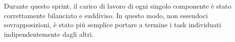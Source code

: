 Durante questo sprint, il carico di lavoro di ogni singolo componente è stato correttamente bilanciato e suddiviso. In questo modo, non essendoci sovrapposizioni, è stato più semplice portare a termine i task individuati indipendentemente dagli altri.